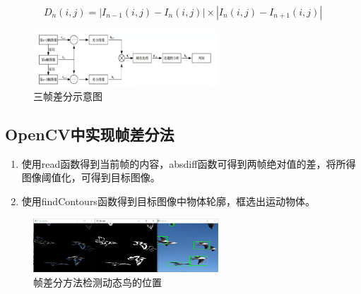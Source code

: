 \begin{equation}
    D_n (i, j) = \left\lvert I_{n - 1} (i, j) - I_n (i, j) \right\rvert \times \left\lvert I_n(i, j) - I_{n + 1} (i, j) \right\rvert
\end{equation}
\begin{figure}
    \centering
    \includegraphics[width=0.618\textwidth]{images/fd_triple.png}
    \caption{三帧差分示意图}
\end{figure}



\subsection{OpenCV中实现帧差分法}

\begin{enumerate}
    \item 使用read函数得到当前帧的内容，absdiff函数可得到两帧绝对值的差，将所得图像阈值化，可得到目标图像。
    \item 使用findContours函数得到目标图像中物体轮廓，框选出运动物体。
\end{enumerate}

\begin{figure}
    \centering
    \includegraphics[width=0.618\textwidth]{images/frame_diff_bird.png}
    \caption{帧差分方法检测动态鸟的位置}
\end{figure}
